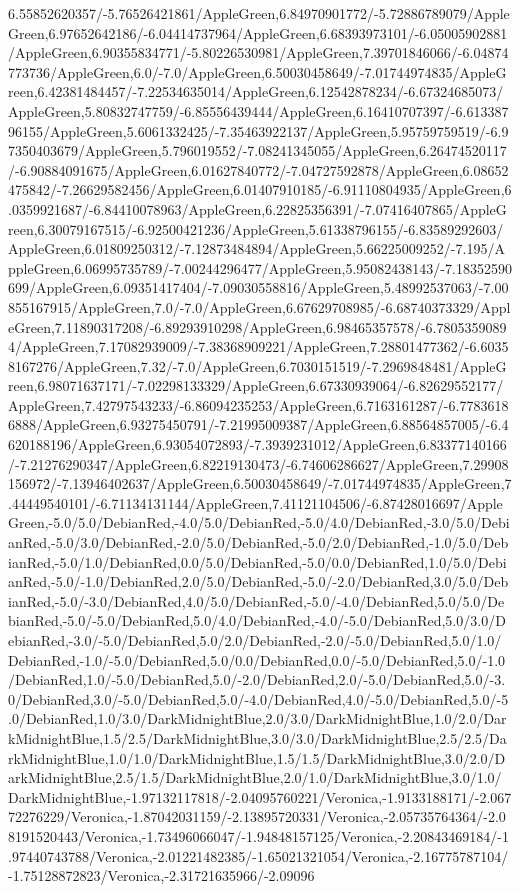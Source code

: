 {\begin{tikzternal}
6.55852620357/-5.76526421861/AppleGreen,6.84970901772/-5.72886789079/AppleGreen,6.97652642186/-6.04414737964/AppleGreen,6.68393973101/-6.05005902881/AppleGreen,6.90355834771/-5.80226530981/AppleGreen,7.39701846066/-6.04874773736/AppleGreen,6.0/-7.0/AppleGreen,6.50030458649/-7.01744974835/AppleGreen,6.42381484457/-7.22534635014/AppleGreen,6.12542878234/-6.67324685073/AppleGreen,5.80832747759/-6.85556439444/AppleGreen,6.16410707397/-6.61338796155/AppleGreen,5.6061332425/-7.35463922137/AppleGreen,5.95759759519/-6.97350403679/AppleGreen,5.796019552/-7.08241345055/AppleGreen,6.26474520117/-6.90884091675/AppleGreen,6.01627840772/-7.04727592878/AppleGreen,6.08652475842/-7.26629582456/AppleGreen,6.01407910185/-6.91110804935/AppleGreen,6.0359921687/-6.84410078963/AppleGreen,6.22825356391/-7.07416407865/AppleGreen,6.30079167515/-6.92500421236/AppleGreen,5.61338796155/-6.83589292603/AppleGreen,6.01809250312/-7.12873484894/AppleGreen,5.66225009252/-7.195/AppleGreen,6.06995735789/-7.00244296477/AppleGreen,5.95082438143/-7.18352590699/AppleGreen,6.09351417404/-7.09030558816/AppleGreen,5.48992537063/-7.00855167915/AppleGreen,7.0/-7.0/AppleGreen,6.67629708985/-6.68740373329/AppleGreen,7.11890317208/-6.89293910298/AppleGreen,6.98465357578/-6.78053590894/AppleGreen,7.17082939009/-7.38368909221/AppleGreen,7.28801477362/-6.60358167276/AppleGreen,7.32/-7.0/AppleGreen,6.7030151519/-7.2969848481/AppleGreen,6.98071637171/-7.02298133329/AppleGreen,6.67330939064/-6.82629552177/AppleGreen,7.42797543233/-6.86094235253/AppleGreen,6.7163161287/-6.77836186888/AppleGreen,6.93275450791/-7.21995009387/AppleGreen,6.88564857005/-6.4620188196/AppleGreen,6.93054072893/-7.3939231012/AppleGreen,6.83377140166/-7.21276290347/AppleGreen,6.82219130473/-6.74606286627/AppleGreen,7.29908156972/-7.13946402637/AppleGreen,6.50030458649/-7.01744974835/AppleGreen,7.44449540101/-6.71134131144/AppleGreen,7.41121104506/-6.87428016697/AppleGreen,-5.0/5.0/DebianRed,-4.0/5.0/DebianRed,-5.0/4.0/DebianRed,-3.0/5.0/DebianRed,-5.0/3.0/DebianRed,-2.0/5.0/DebianRed,-5.0/2.0/DebianRed,-1.0/5.0/DebianRed,-5.0/1.0/DebianRed,0.0/5.0/DebianRed,-5.0/0.0/DebianRed,1.0/5.0/DebianRed,-5.0/-1.0/DebianRed,2.0/5.0/DebianRed,-5.0/-2.0/DebianRed,3.0/5.0/DebianRed,-5.0/-3.0/DebianRed,4.0/5.0/DebianRed,-5.0/-4.0/DebianRed,5.0/5.0/DebianRed,-5.0/-5.0/DebianRed,5.0/4.0/DebianRed,-4.0/-5.0/DebianRed,5.0/3.0/DebianRed,-3.0/-5.0/DebianRed,5.0/2.0/DebianRed,-2.0/-5.0/DebianRed,5.0/1.0/DebianRed,-1.0/-5.0/DebianRed,5.0/0.0/DebianRed,0.0/-5.0/DebianRed,5.0/-1.0/DebianRed,1.0/-5.0/DebianRed,5.0/-2.0/DebianRed,2.0/-5.0/DebianRed,5.0/-3.0/DebianRed,3.0/-5.0/DebianRed,5.0/-4.0/DebianRed,4.0/-5.0/DebianRed,5.0/-5.0/DebianRed,1.0/3.0/DarkMidnightBlue,2.0/3.0/DarkMidnightBlue,1.0/2.0/DarkMidnightBlue,1.5/2.5/DarkMidnightBlue,3.0/3.0/DarkMidnightBlue,2.5/2.5/DarkMidnightBlue,1.0/1.0/DarkMidnightBlue,1.5/1.5/DarkMidnightBlue,3.0/2.0/DarkMidnightBlue,2.5/1.5/DarkMidnightBlue,2.0/1.0/DarkMidnightBlue,3.0/1.0/DarkMidnightBlue,-1.97132117818/-2.04095760221/Veronica,-1.9133188171/-2.06772276229/Veronica,-1.87042031159/-2.13895720331/Veronica,-2.05735764364/-2.08191520443/Veronica,-1.73496066047/-1.94848157125/Veronica,-2.20843469184/-1.97440743788/Veronica,-2.01221482385/-1.65021321054/Veronica,-2.16775787104/-1.75128872823/Veronica,-2.31721635966/-2.09096
\end{tikzternal}}
